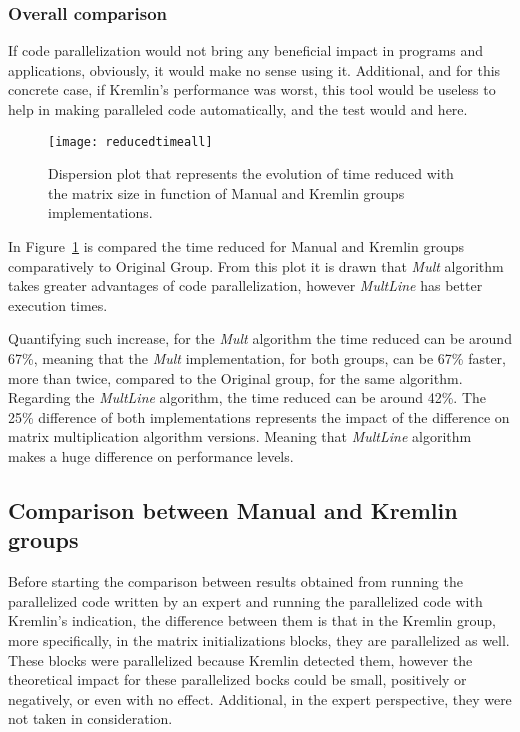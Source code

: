 \subsubsection{Overall comparison}\label{subsubsec:overall}

If code parallelization would not bring any beneficial impact in programs and applications, obviously, it would make no sense using it. Additional, and for this concrete case, if Kremlin's performance was worst, this tool would be useless to help in making paralleled code automatically, and the test would and here.


\begin{figure}[htb]
	\begin{center}
		\leavevmode
		\texttt{[image: reducedtimeall]}
		\caption{Dispersion plot that represents the evolution of time reduced with the matrix size in function of Manual and Kremlin groups implementations.}
		\label{fig:reducedtimeall}
	\end{center}
\end{figure}

In Figure~\ref{fig:reducedtimeall} is compared the time reduced for Manual and Kremlin groups comparatively to Original Group. From this plot it is drawn that \textit{Mult} algorithm takes greater advantages of code parallelization, however \textit{MultLine} has better execution times. 

Quantifying such increase, for the \textit{Mult} algorithm  the time reduced can be around 67\%, meaning that the \textit{Mult} implementation, for both groups, can be 67\% faster, more than twice, compared to the Original group, for the same algorithm.
Regarding the \textit{MultLine} algorithm, the time reduced can be around 42\%. The 25\% difference of both implementations represents the impact of the difference on matrix multiplication algorithm versions. Meaning that \textit{MultLine} algorithm makes a huge difference on performance levels.



\subsection{Comparison between Manual and Kremlin groups}

Before starting the comparison between results obtained from running the parallelized code written by an expert and running the parallelized code with Kremlin's indication, the difference between them is that in the Kremlin group, more specifically, in the matrix initializations blocks, they are parallelized as well. These blocks were parallelized because Kremlin detected them, however the theoretical impact for these parallelized bocks could be small, positively or negatively, or even with no effect. Additional, in the expert perspective, they were not taken in consideration.

